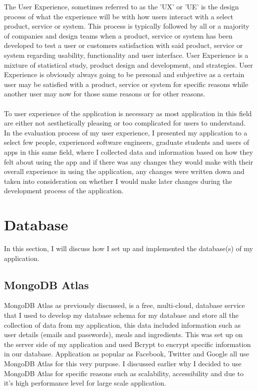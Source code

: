 The User Experience, sometimes referred to as the 'UX' or 'UE' is the design process of what the experience will be with how users interact with a select product, service or system. This process is typically followed by all or a majority of companies and design teams when a product, service or system has been developed to test a user or customers satisfaction with said product, service or system regarding usability, functionality and user interface. User Experience is a mixture of statistical study, product design and development, and strategies. User Experience is obviously always going to be personal and subjective as a certain user may be satisfied with a product, service or system for specific reasons while another user may now for those same reasons or for other reasons.\\ \\
To user experience of the application is necessary as most application in this field are either not aesthetically pleasing or too complicated for users to understand. In the evaluation process of my user experience, I presented my application to a select few people, experienced software engineers, graduate students and users of apps in this same field, where I collected data and information based on how they felt about using the app and if there was any changes they would make with their overall experience in using the application, any changes were written down and taken into consideration on whether I would make later changes during the development process of the application.

\section{Database}

In this section, I will discuss how I set up and implemented the database(s) of my application.

\subsection{MongoDB Atlas}

MongoDB Atlas as previously discussed, is a free, multi-cloud, database service that I used to develop my database schema for my database and store all the collection of data from my application, this data included information such as user details (emails and passwords), meals and ingredients. This was set up on the server side of my application and used Bcrypt to encrypt specific information in our database. Application as popular as Facebook, Twitter and Google all use MongoDB Atlas for this very purpose. I discussed earlier why I decided to use MongoDB Atlas for specific reasons such as scalability, accessibility and due to it's high performance level for large scale application.

